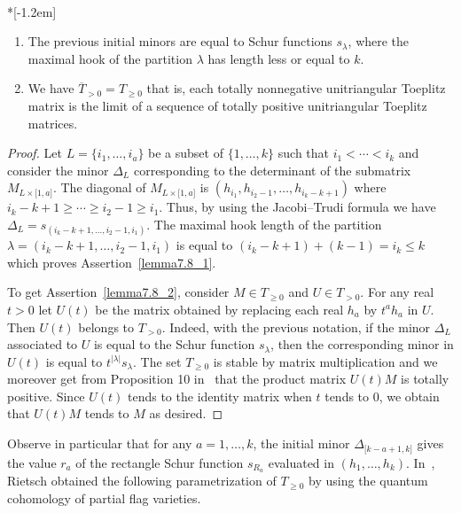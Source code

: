 \documentclass[ALCO,ThmDefs,Unicode,epreuves]{cedram}
\begin{document}
\begin{lemma}\label{Lemma_closed}\ \\*[-1.2em]

\begin{enumerate}
\item\label{lemma7.8_1} The previous initial minors are equal to Schur functions $s_{\lambda}$,
where the maximal hook of the partition $\lambda$ has length less or equal to
$k$.

\item\label{lemma7.8_2} We have $\overline{T}_{>0}=T_{\geq0}$ that is, each totally nonnegative
unitriangular Toeplitz matrix is the limit of a sequence of totally positive
unitriangular Toeplitz matrices.
\end{enumerate}

\begin{proof}
Let $L=\{i_{1},\ldots,i_{a}\}$ be a subset of $\{1,\ldots,k\}$ such that
$i_{1}<\cdots<i_{k}$ and consider the minor $\Delta_{L}$ corresponding to the
determinant of the submatrix $M_{L\times\lbrack1,a]}$. The diagonal of
$M_{L\times\lbrack1,a]}$ is $(h_{i_{1}},h_{i_{2}-1},\ldots,h_{i_{k}-k+1})$
where $i_{k}-k+1\geq\cdots\geq i_{2}-1\geq i_{1}$. Thus, by using the
Jacobi--Trudi formula we have $\Delta_{L}=s_{(i_{k}-k+1,\ldots,i_{2}-1,i_{1})}%
$. The maximal hook length of the partition $\lambda=(i_{k}-k+1,\ldots
,i_{2}-1,i_{1})$ is equal to $(i_{k}-k+1)+(k-1)=i_{k}\leq k$ which proves
Assertion~\eqref{lemma7.8_1}.

To get Assertion~\eqref{lemma7.8_2}, consider $M\in T_{\geq0}$ and $U\in T_{>0}$. For any real
$t>0$ let $U(t)$ be the matrix obtained by replacing each real $h_{a}$ by
$t^{a}h_{a}$ in $U$. Then $U(t)$ belongs to $T_{>0}$. Indeed, with the
previous notation, if the minor $\Delta_{L}$ associated to $U$ is equal to the
Schur function $s_{\lambda}$, then the corresponding minor in $U(t)$ is equal
to $t^{\left\vert \lambda\right\vert }s_{\lambda}$. The set $T_{\geq0}$ is
stable by matrix multiplication and we moreover get from Proposition 10 in~\cite{FZ} 
that the product matrix $U(t)M$ is totally positive. Since $U(t)$
tends to the identity matrix when $t$ tends to $0$, we obtain that $U(t)M$
tends to $M$ as desired.
\end{proof}
\end{lemma}

Observe in particular that for any $a=1,\ldots,k$, the initial minor
$\Delta_{\lbrack k-a+1,k]}$ gives the value $r_{a}$ of the rectangle Schur
function $s_{R_{a}}$ evaluated in $(h_{1},\ldots,h_{k})$. In~\cite{Ri},
Rietsch obtained the following parametrization of $T_{\geq0}$ by using the
quantum cohomology of partial flag varieties.
\end{document}

